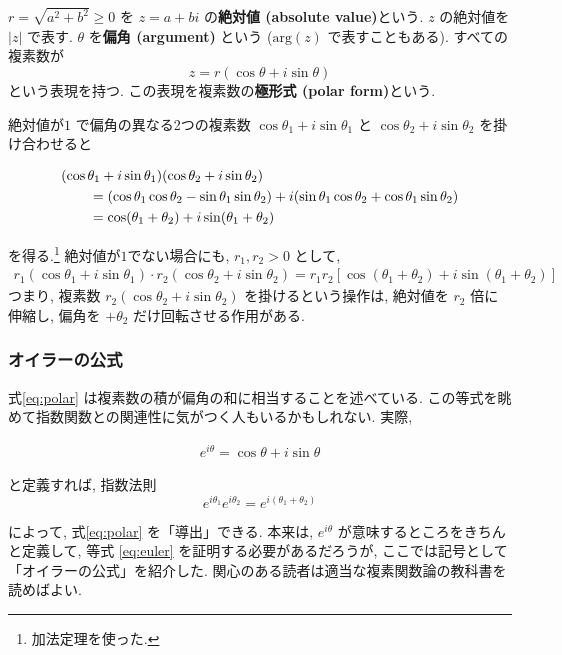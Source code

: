 \documentclass[a4paper]{scrbook}
\theoremstyle{definition}
\begin{document}
\(r = \sqrt{a^2 + b^2}\ge 0\) を \(z = a + bi\) の\textbf{絶対値
(absolute value)}という. \(z\) の絶対値を \(|z|\) で表す. \(\theta\)
を\textbf{偏角 (argument)} という (\(\mathrm{arg}(z)\)
で表すこともある). すべての複素数が \[
  z = r(\cos\theta + i\sin\theta)
\] という表現を持つ. この表現を複素数の\textbf{極形式 (polar
form)}という.

絶対値が\(1\) で偏角の異なる2つの複素数 \(\cos\theta_1 + i\sin\theta_1\)
と \(\cos\theta_2 + i\sin\theta_2\) を掛け合わせると

\begin{align}
  &(\cos\theta_1 + i\sin\theta_1)(\cos\theta_2 + i\sin\theta_2) \notag \\
  &\qquad=
  (\cos\theta_1 \cos\theta_2 - \sin\theta_1\sin\theta_2)
  +
  i(\sin\theta_1\cos\theta_2 + \cos\theta_1\sin\theta_2) \notag \\
  &\qquad=
  \cos(\theta_1 + \theta_2) + i\sin(\theta_1 + \theta_2) \label{eq:polar}
\end{align}

を得る.\footnote{加法定理を使った.} 絶対値が\(1\)でない場合にも,
\(r_1, r_2 > 0\) として, \[
\begin{aligned}
  r_1(\cos\theta_1 + i\sin\theta_1)\cdot r_2(\cos\theta_2 + i\sin\theta_2)
  =
  r_1 r_2 \left[
    \cos(\theta_1 + \theta_2) + i\sin(\theta_1 + \theta_2)
  \right]
\end{aligned}
\] つまり, 複素数 \(r_2(\cos\theta_2 + i\sin\theta_2)\)
を掛けるという操作は, 絶対値を \(r_2\) 倍に伸縮し, 偏角を \(+\theta_2\)
だけ回転させる作用がある.

\subsubsection*{オイラーの公式}

式\eqref{eq:polar} は複素数の積が偏角の和に相当することを述べている.
この等式を眺めて指数関数との関連性に気がつく人もいるかもしれない. 実際,

\begin{align}
  e^{i\theta} = \cos\theta + i\sin\theta \label{eq:euler}
\end{align}

と定義すれば, 指数法則 \[
  e^{i\theta_1} e^{i\theta_2} = e^{i(\theta_1 + \theta_2)}
\]

によって, 式\eqref{eq:polar} を「導出」できる. 本来は, \(e^{i\theta}\)
が意味するところをきちんと定義して, 等式 \eqref{eq:euler}
を証明する必要があるだろうが,
ここでは記号として「オイラーの公式」を紹介した.
関心のある読者は適当な複素関数論の教科書を読めばよい.
\end{document}
